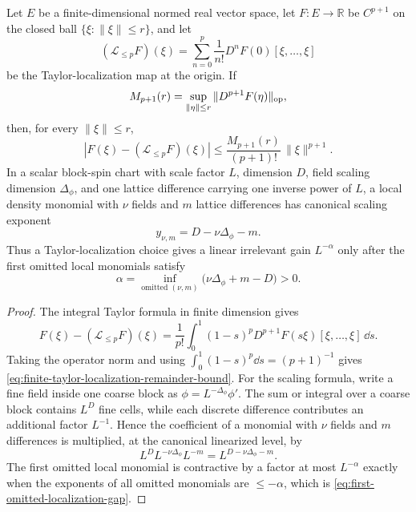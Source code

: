 \begin{lemma}
\label{lem:finite-localization-remainder-scaling-gain}
Let \(E\) be a finite-dimensional normed real vector space, let
\(F:E\to\mathbb R\) be \(C^{p+1}\) on the closed ball
\(\{\xi:\|\xi\|\leq r\}\), and let
\[
  (\mathcal L_{\leq p}F)(\xi)
  =
  \sum_{n=0}^{p}\frac{1}{n!}D^nF(0)[\xi,\ldots,\xi]
\]
be the Taylor-localization map at the origin.  If
\[
  M_{p+1}(r)
  =
  \sup_{\|\eta\|\leq r}\|D^{p+1}F(\eta)\|_{\rm op},
\]
then, for every \(\|\xi\|\leq r\),
\begin{equation}
  |F(\xi)-(\mathcal L_{\leq p}F)(\xi)|
  \leq
  \frac{M_{p+1}(r)}{(p+1)!}\,\|\xi\|^{p+1}.
  \label{eq:finite-taylor-localization-remainder-bound}
\end{equation}
In a scalar block-spin chart with scale factor \(L\), dimension \(D\), field
scaling dimension \(\Delta_\phi\), and one lattice difference carrying one
inverse power of \(L\), a local density monomial with \(\nu\) fields and
\(m\) lattice differences has canonical scaling exponent
\begin{equation}
  y_{\nu,m}=D-\nu\Delta_\phi-m .
  \label{eq:canonical-localization-scaling-exponent}
\end{equation}
Thus a Taylor-localization choice gives a linear irrelevant gain
\(L^{-\alpha}\) only after the first omitted local monomials satisfy
\begin{equation}
  \alpha
  =
  \inf_{\text{omitted }(\nu,m)}
  \bigl(\nu\Delta_\phi+m-D\bigr)
  >0 .
  \label{eq:first-omitted-localization-gap}
\end{equation}
\end{lemma}

\begin{proof}
The integral Taylor formula in finite dimension gives
\[
  F(\xi)-(\mathcal L_{\leq p}F)(\xi)
  =
  \frac{1}{p!}
  \int_0^1
    (1-s)^p D^{p+1}F(s\xi)[\xi,\ldots,\xi]\,\dd s .
\]
Taking the operator norm and using
\(\int_0^1(1-s)^p\dd s=(p+1)^{-1}\) gives
\eqref{eq:finite-taylor-localization-remainder-bound}.  For the scaling
formula, write a fine field inside one coarse block as
\(\phi=L^{-\Delta_\phi}\phi'\).  The sum or integral over a coarse block
contains \(L^D\) fine cells, while each discrete difference contributes an
additional factor \(L^{-1}\).  Hence the coefficient of a monomial with
\(\nu\) fields and \(m\) differences is multiplied, at the canonical
linearized level, by
\[
  L^D L^{-\nu\Delta_\phi}L^{-m}=L^{D-\nu\Delta_\phi-m}.
\]
The first omitted local monomial is contractive by a factor at most
\(L^{-\alpha}\) exactly when the exponents of all omitted monomials are
\(\leq-\alpha\), which is
\eqref{eq:first-omitted-localization-gap}.
\end{proof}

